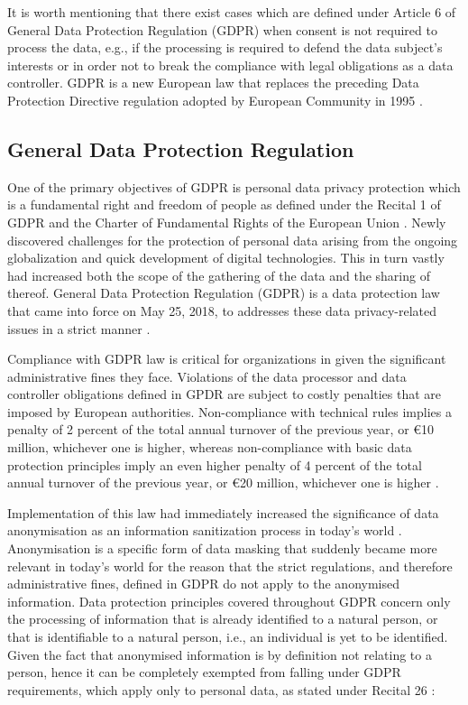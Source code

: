 \documentclass[a4paper,twoside,12pt]{book}
\begin{document}
It is worth mentioning that there exist cases which are defined under Article 6 of General Data Protection Regulation (GDPR) \cite{bib:art6} when consent is not required to process the data, e.g., if the processing is required to defend the data subject's interests or in order not to break the compliance with legal obligations as a data controller. GDPR is a new European law that replaces the preceding Data Protection Directive regulation adopted by European Community in 1995 \cite{bib:gdpr_practical_guide}. 

\subsection{General Data Protection Regulation}

One of the primary objectives of GDPR is personal data privacy protection which is a fundamental right and freedom of people as defined under the Recital 1 of GDPR \cite{bib:recital1} and the Charter of Fundamental Rights of the European Union \cite{bib:charter}. Newly discovered challenges for the protection of personal data arising from the ongoing globalization and quick development of digital technologies. This in turn vastly had increased both the scope of the gathering of the data and the sharing of thereof. General Data Protection Regulation (GDPR) is a data protection law that came into force on May 25, 2018, to addresses these data privacy-related issues in a strict manner \cite{bib:recital6}.

Compliance with GDPR law is critical for organizations in given the significant administrative fines they face. Violations of the data processor and data controller obligations defined in GPDR are subject to costly penalties that are imposed by European authorities. Non-compliance with technical rules implies a penalty of 2 percent of the total annual turnover of the previous year, or €10 million, whichever one is higher, whereas non-compliance with basic data protection principles imply an even higher penalty of 4 percent of the total annual turnover of the previous year, or €20 million, whichever one is higher \cite{bib:art83}\cite{bib:gdpr_managing_data_risk}.

Implementation of this law had immediately increased the significance of data anonymisation as an information sanitization process in today's world \cite{bib:anonymization_for_research}. Anonymisation is a specific form of data masking that suddenly became more relevant in today's world for the reason that the strict regulations, and therefore administrative fines, defined in GDPR do not apply to the anonymised information. Data protection principles covered throughout GDPR concern only the processing of information that is already identified to a natural person, or that is identifiable to a natural person, i.e., an individual is yet to be identified. Given the fact that anonymised information is by definition not relating to a person, hence it can be completely exempted from falling under GDPR requirements, which apply only to personal data, as stated under Recital 26 \cite{bib:recital26}:
\end{document}
